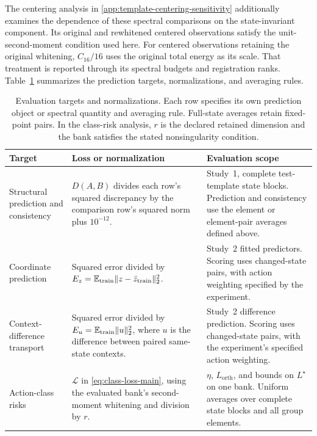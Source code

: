 The centering analysis in
\cref{app:template-centering-sensitivity} additionally
examines the dependence of these spectral comparisons
on the state-invariant component.
Its original and rewhitened centered observations satisfy
the unit-second-moment condition used here.
For centered observations retaining the original whitening,
$C_{16}/16$ uses the original total energy as its scale.
That treatment is reported through its spectral budgets
and registration ranks.
Table~\ref{tab:metric-contract} summarizes the prediction
targets, normalizations, and averaging rules.

\begin{table}[t]
\caption{
Evaluation targets and normalizations.
Each row specifies its own prediction object or spectral
quantity and averaging rule.
Full-state averages retain fixed-point pairs.
In the class-risk analysis, $r$ is the declared retained
dimension and the bank satisfies the stated nonsingularity
condition.
}
\label{tab:metric-contract}
\centering
\small
\begin{tabular}{
 @{}p{}
 p{}
 p{}@{}
}
\toprule
Target & Loss or normalization & Evaluation scope \\
\midrule

{\raggedright
Structural prediction and consistency\par}
&
$D(A,B)$ divides each row's squared discrepancy by the
comparison row's squared norm plus $10^{-12}$.
&
Study~1, complete test-template state blocks.
Prediction and consistency use the element or element-pair
averages defined above.
\\[3pt]

Coordinate prediction
&
Squared error divided by
$E_z=\mathbb E_{\rm train}
 \|z-\bar z_{\rm train}\|_2^2$.
&
Study~2 fitted predictors.
Scoring uses changed-state pairs, with action weighting
specified by the experiment.
\\[3pt]

{\raggedright
Context-difference transport\par}
&
Squared error divided by
$E_u=\mathbb E_{\rm train}\|u\|_2^2$,
where $u$ is the difference between paired
same-state contexts.
&
Study~2 difference prediction.
Scoring uses changed-state pairs, with the experiment's
specified action weighting.
\\[3pt]

Action-class risks
&
$\mathcal L$ in \cref{eq:class-loss-main},
using the evaluated bank's second-moment whitening
and division by $r$.
&
$\eta$, $L_{\mathrm{orth}}$, and bounds on $L^\star$
on one bank.
Uniform averages over complete state blocks and all
group elements.
\\[3pt]


\end{tabular}
\end{table}
